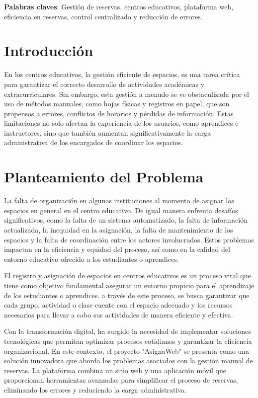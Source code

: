 \documentclass[12pt,a4paper]{article}
\begin{document}
\begin{multicols}{2}
\textbf{Palabras claves}: Gestión de reservas, centros educativos, plataforma web, eficiencia en reservas, control centralizado y reducción de errores.

\section*{Introducción}
En los centros educativos, la gestión eficiente de espacios, es una tarea crítica para garantizar el correcto desarrollo de actividades académicas y extracurriculares. Sin embargo, esta gestión a menudo se ve obstaculizada por el uso de métodos manuales, como hojas físicas y registros en papel, que son propensos a errores, conflictos de horarios y pérdidas de información. Estas limitaciones no solo afectan la experiencia de los usuarios, como aprendices e instructores, sino que también aumentan significativamente la carga administrativa de los encargados de coordinar los espacios.


\section*{Planteamiento del Problema}
La falta de organización en algunas instituciones al momento de asignar los espacios en general en el centro educativo. De igual manera enfrenta desafíos significativos, como la falta de un sistema automatizado, la falta de información actualizada, la inequidad en la asignación, la falta de mantenimiento de los espacios y la falta de coordinación entre los actores involucrados. Estos problemas impactan en la eficiencia y equidad del proceso, así como en la calidad del entorno educativo ofrecido a los estudiantes o aprendices. 

El registro y asignación de espacios en centros educativos es un proceso vital que tiene como objetivo fundamental asegurar un entorno propicio para el aprendizaje de los estudiantes o aprendices. a través de este proceso, se busca garantizar que cada grupo, actividad o clase cuente con el espacio adecuado y los recursos necesarios para llevar a cabo sus actividades de manera eficiente y efectiva.

Con la transformación digital, ha surgido la necesidad de implementar soluciones tecnológicas que permitan optimizar procesos cotidianos y garantizar la eficiencia organizacional. En este contexto, el proyecto "AsignaWeb" se presenta como una solución innovadora que aborda los problemas asociados con la gestión manual de reservas. La plataforma combina un sitio web y una aplicación móvil que proporcionan herramientas avanzadas para simplificar el proceso de reservas, eliminando los errores y reduciendo la carga administrativa.



\end{multicols}
\end{document}
